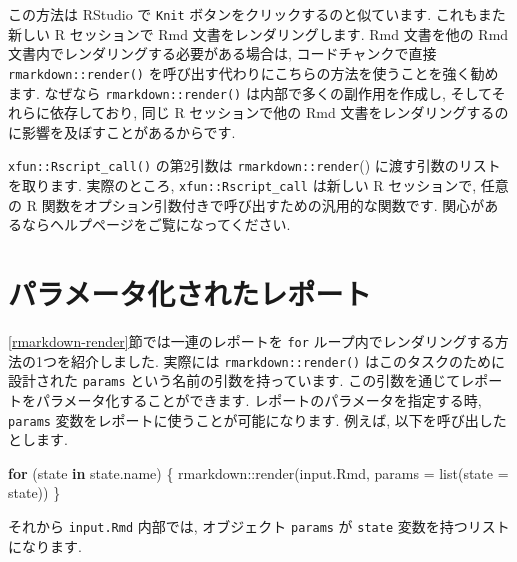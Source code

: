 \documentclass[
  11pt,
]{bxjsreport}
\newenvironment{Shaded}{\begin{snugshade}}{\end{snugshade}}
\newcommand{\AnnotationTok}[1]{\textcolor[rgb]{0.56,0.35,0.01}{\textbf{\textit{#1}}}}
\newcommand{\AttributeTok}[1]{\textcolor[rgb]{0.77,0.63,0.00}{#1}}
\newcommand{\CommentTok}[1]{\textcolor[rgb]{0.56,0.35,0.01}{\textit{#1}}}
\newcommand{\ControlFlowTok}[1]{\textcolor[rgb]{0.13,0.29,0.53}{\textbf{#1}}}
\newcommand{\FunctionTok}[1]{\textcolor[rgb]{0.00,0.00,0.00}{#1}}
\newcommand{\InformationTok}[1]{\textcolor[rgb]{0.56,0.35,0.01}{\textbf{\textit{#1}}}}
\newcommand{\NormalTok}[1]{#1}
\newcommand{\SpecialCharTok}[1]{\textcolor[rgb]{0.00,0.00,0.00}{#1}}
\newcommand{\StringTok}[1]{\textcolor[rgb]{0.31,0.60,0.02}{#1}}
\begin{document}
この方法は RStudio で \texttt{Knit} ボタンをクリックするのと似ています. これもまた新しい R セッションで Rmd 文書をレンダリングします. Rmd 文書を他の Rmd 文書内でレンダリングする必要がある場合は, コードチャンクで直接 \texttt{rmarkdown::render()} を呼び出す代わりにこちらの方法を使うことを強く勧めます. なぜなら \texttt{rmarkdown::render()} は内部で多くの副作用を作成し, そしてそれらに依存しており, 同じ R セッションで他の Rmd 文書をレンダリングするのに影響を及ぼすことがあるからです.

\texttt{xfun::Rscript\_call()} の第2引数は \texttt{rmarkdown::render}() に渡す引数のリストを取ります. 実際のところ, \texttt{xfun::Rscript\_call} は新しい R セッションで, 任意の R 関数をオプション引数付きで呼び出すための汎用的な関数です. 関心があるならヘルプページをご覧になってください.

\hypertarget{parameterized-reports}{%
\section{パラメータ化されたレポート}\label{parameterized-reports}}

\ref{rmarkdown-render}節では一連のレポートを \texttt{for} ループ内でレンダリングする方法の1つを紹介しました. 実際には \texttt{rmarkdown::render()} はこのタスクのために設計された \texttt{params} という名前の引数を持っています. この引数を通じてレポートをパラメータ化することができます. レポートのパラメータを指定する時, \texttt{params} 変数をレポートに使うことが可能になります. 例えば, 以下を呼び出したとします.

\begin{Shaded}
\begin{Highlighting}[numbers=left,,]
\ControlFlowTok{for}\NormalTok{ (state }\ControlFlowTok{in}\NormalTok{ state.name) \{}
\NormalTok{  rmarkdown}\SpecialCharTok{::}\FunctionTok{render}\NormalTok{(}\StringTok{\textquotesingle{}input.Rmd\textquotesingle{}}\NormalTok{, }\AttributeTok{params =} \FunctionTok{list}\NormalTok{(}\AttributeTok{state =}\NormalTok{ state))}
\NormalTok{\}}
\end{Highlighting}
\end{Shaded}

それから \texttt{input.Rmd} 内部では, オブジェクト \texttt{params} が \texttt{state} 変数を持つリストになります.

\begin{Shaded}
\end{Shaded}
\end{document}
